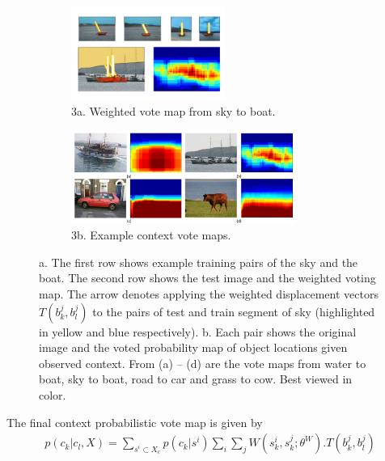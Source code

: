 \captionsetup[subfigure]{labelformat=empty}
\begin{figure}[ht!]
\centering
\begin{subfigure}[t]{0.48\textwidth}
\centering
\includegraphics[height=1.2in]{figures/vote_sky_boat.pdf}
\caption{3a. Weighted vote map from sky to boat.}
\label{fig:vote_sky_boat}
\end{subfigure}
\begin{subfigure}[t]{0.48\textwidth}
\centering
\includegraphics[height=1.2in]{figures/votemap.pdf}
\caption{3b. Example context vote maps.}
\label{fig:votemap}
\end{subfigure}
\caption{a. The first row shows example training pairs of the sky and the boat. 
The second row shows the test image and the weighted voting map. 
The arrow denotes applying the weighted displacement vectors $T(b_k^j,b_l^j)$ to the pairs of test and train segment of sky
(highlighted in yellow and blue respectively). 
b. Each pair shows the original image and the voted probability
map of object locations given observed context. From (a) -- (d) are the vote maps from water to boat, sky to boat, road to car and grass to cow. Best viewed in color.
}
\end{figure}

The final context probabilistic vote map is given by
\begin{eqnarray}
p(c_k|c_l,X) =  \sum_{s^i \subset X_c} p(c_k|s^i) \sum_{i} \sum_{j} W(s_k^i,s_k^j;\theta^W).T(b_k^j,b_l^j)\nonumber\\
\end{eqnarray}

